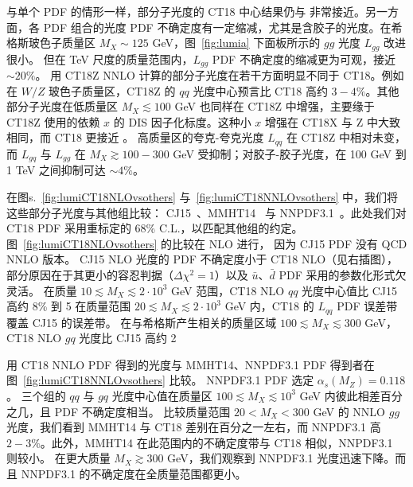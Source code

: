 与单个 PDF 的情形一样，部分子光度的 CT18 中心结果仍与 \CTHERAII{} 非常接近。另一方面，各 PDF 组合的光度 PDF 不确定度有一定缩减，尤其是含胶子的光度。在希格斯玻色子质量区 $M_X\! \sim\! 125$ GeV，图~\ref{fig:lumia} 下面板所示的 $gg$ 光度 $L_\mathit{gg}$ 改进很小。
但在 TeV 尺度的质量范围内，$L_\mathit{gg}$ PDF 不确定度的缩减更为可观，接近 $\sim\!20\%$。
用 CT18Z NNLO 计算的部分子光度在若干方面明显不同于 CT18。例如在
$W/Z$ 玻色子质量区，CT18Z 的 $qq$ 光度中心预言比 CT18 高约 $3\!-\!4\%$。其他部分子光度在低质量区 $M_X\! \lesssim\! 100$ GeV 也同样在 CT18Z 中增强，主要缘于 CT18Z 使用的依赖 $x$ 的 DIS 因子化标度。这种小 $x$ 增强在 CT18X 与 Z 中大致相同，而 CT18 更接近 \CTHERAII。
高质量区的夸克-夸克光度 $L_{qq}$ 在 CT18Z 中相对未变，
而 $L_{gq}$ 与 $L_{gg}$ 在 $M_X\! \gtrsim\! 100\!-\!300$ GeV 受抑制；对胶子-胶子光度，在 100 GeV 到 1 TeV 之间抑制可达 $\sim\!4\%$。

在图s.~\ref{fig:lumiCT18NLOvsothers}
与~\ref{fig:lumiCT18NNLOvsothers} 中，我们将这些部分子光度与其他组比较：
CJ15~\cite{Accardi:2016qay}、MMHT14~\cite{Harland-Lang:2014zoa} 与
NNPDF3.1~\cite{Ball:2017nwa}。此处我们对 CT18 PDF 采用重标定的 68\% C.L.，以匹配其他组的约定。
图~\ref{fig:lumiCT18NLOvsothers} 的比较在 NLO 进行，
因为 CJ15 PDF 没有 QCD NNLO 版本。
CJ15 NLO 光度的 PDF 不确定度小于 CT18 NLO（见右插图），部分原因在于其更小的容忍判据（$\Delta \chi^2 =1$）以及 $\bar u$、$\bar d$ PDF 采用的参数化形式欠灵活。
在质量 $10\lesssim M_{X}\lesssim 2\cdot  10^{3}$ GeV 范围，CT18 NLO $qq$ 光度中心值比 CJ15 高约 8\% 到 5%
在质量范围 $20\lesssim M_{X}\lesssim 2\cdot  10^{3}$ GeV 内，CT18 的 $L_{qq}$ PDF 误差带覆盖 CJ15 的误差带。
在与希格斯产生相关的质量区域
$100\lesssim M_{X}\lesssim 300$ GeV，CT18 NLO $gq$ 光度比 CJ15 高约 2%

用 CT18 NNLO PDF 得到的光度与 MMHT14、NNPDF3.1 PDF 得到者在图~\ref{fig:lumiCT18NNLOvsothers} 比较。
NNPDF3.1 PDF 选定 $\alpha_s(M_Z) = 0.118$。
三个组的 $qq$ 与 $gq$ 光度中心值在质量区 $100\lesssim
M_{X}\lesssim 10^{3}$ GeV 内彼此相差百分之几，且 PDF 不确定度相当。
比较质量范围 $20 < M_X < 300$ GeV 的 NNLO $gg$ 光度，我们看到 MMHT14 与 CT18 差别在百分之一左右，而 NNPDF3.1 高 $2-3\%$。此外，MMHT14 在此范围内的不确定度带与 CT18 相似，NNPDF3.1 则较小。
在更大质量 $M_X \gtrsim 300$ GeV，我们观察到 NNPDF3.1 光度迅速下降。而且 NNPDF3.1 的不确定度在全质量范围都更小。

